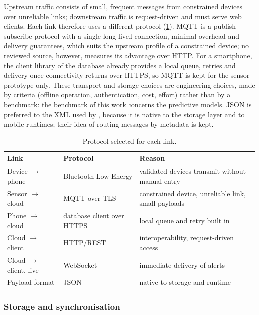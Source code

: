 Upstream traffic consists of small, frequent messages from constrained devices over unreliable links; downstream traffic is request-driven and must serve web clients. Each link therefore uses a different protocol (\cref{tab:protocol-selection}). MQTT is a publish--subscribe protocol with a single long-lived connection, minimal overhead and delivery guarantees, which suits the upstream profile of a constrained device; no reviewed source, however, measures its advantage over HTTP. For a smartphone, the client library of the database already provides a local queue, retries and delivery once connectivity returns over HTTPS, so MQTT is kept for the sensor prototype only. These transport and storage choices are engineering choices, made by criteria (offline operation, authentication, cost, effort) rather than by a benchmark: the benchmark of this work concerns the predictive models. JSON is preferred to the XML used by \textcite{yazdani2018}, because it is native to the storage layer and to mobile runtimes; their idea of routing messages by metadata is kept.

\begin{table}[htbp]
\centering\small
\caption{Protocol selected for each link.}\label{tab:protocol-selection}
\begin{tabularx}{\textwidth}{@{}>{\raggedright\arraybackslash}p{3.6cm} >{\raggedright\arraybackslash}p{3.0cm} X@{}}
\toprule
\textbf{Link} & \textbf{Protocol} & \textbf{Reason} \\
\midrule
Device $\rightarrow$ phone & Bluetooth Low Energy & validated devices transmit without manual entry \\
Sensor $\rightarrow$ cloud & MQTT over TLS & constrained device, unreliable link, small payloads \\
Phone $\rightarrow$ cloud & database client over HTTPS & local queue and retry built in \\
Cloud $\rightarrow$ client & HTTP/REST & interoperability, request-driven access \\
Cloud $\rightarrow$ client, live & WebSocket & immediate delivery of alerts \\
Payload format & JSON & native to storage and runtime \\
\bottomrule
\end{tabularx}
\end{table}

\subsubsection{Storage and synchronisation}\label{sec:backend-req}\label{sec:schema}\label{sec:offline}\label{sec:alerting}

